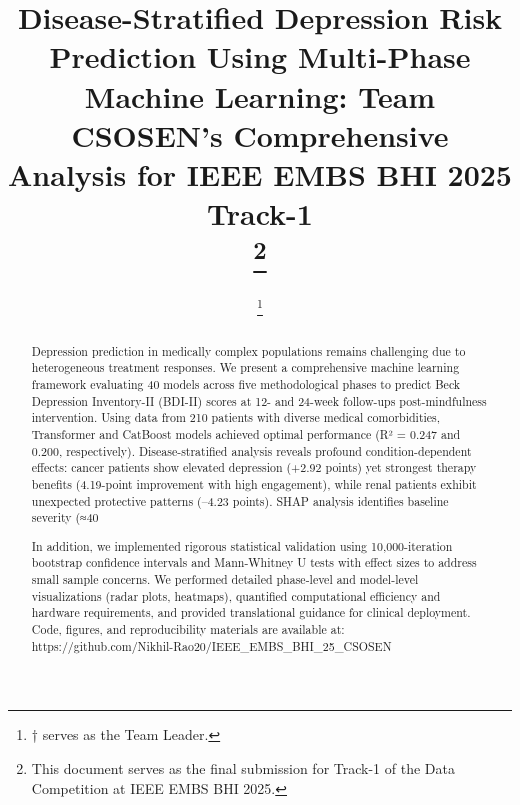 \documentclass[conference]{IEEEtran}
\begin{document}
\title{Disease-Stratified Depression Risk Prediction Using Multi-Phase Machine Learning: Team CSOSEN's Comprehensive Analysis for IEEE EMBS BHI 2025 Track-1\\
\thanks{This document serves as the final submission for Track-1 of the Data Competition at IEEE EMBS BHI 2025.}
}

\author{
\and
{}
\and
{}
\thanks{† serves as the Team Leader.}
}

\maketitle


\begin{abstract}
Depression prediction in medically complex populations remains challenging due to heterogeneous treatment responses. We present a comprehensive machine learning framework evaluating 40 models across five methodological phases to predict Beck Depression Inventory-II (BDI-II) scores at 12- and 24-week follow-ups post-mindfulness intervention. Using data from 210 patients with diverse medical comorbidities, Transformer and CatBoost models achieved optimal performance (R² = 0.247 and 0.200, respectively). Disease-stratified analysis reveals profound condition-dependent effects: cancer patients show elevated depression (+2.92 points) yet strongest therapy benefits (4.19-point improvement with high engagement), while renal patients exhibit unexpected protective patterns (–4.23 points). SHAP analysis identifies baseline severity (≈40%

In addition, we implemented rigorous statistical validation using 10,000-iteration bootstrap confidence intervals and Mann-Whitney U tests with effect sizes to address small sample concerns. We performed detailed phase-level and model-level visualizations (radar plots, heatmaps), quantified computational efficiency and hardware requirements, and provided translational guidance for clinical deployment. Code, figures, and reproducibility materials are available at: https://github.com/Nikhil-Rao20/IEEE_EMBS_BHI_25_CSOSEN
\end{abstract}
\end{document}
